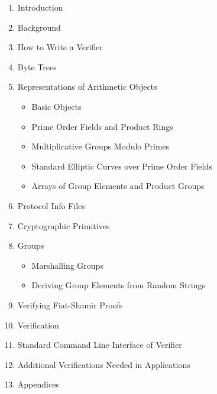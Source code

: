 \begin{enumerate}
\item Introduction
\item Background
\item How to Write a Verifier
\item Byte Trees
\item Representations of Arithmetic Objects

\begin{itemize}
\item Basic Objects
\item Prime Order Fields and Product Rings
\item Multiplicative Groups Modulo Primes
\item Standard Elliptic Curves over Prime Order Fields
\item Arrays of Group Elements and Product Groups
\end{itemize}

\item Protocol Info Files
\item Cryptographic Primitives
\item Groups

\begin{itemize}
\item Marshalling Groups
\item Deriving Group Elements from Random Strings
\end{itemize}

\item Verifying Fiat-Shamir Proofs
\item Verification
\item Standard Command Line Interface of Verifier
\item Additional Verifications Needed in Applications
\item Appendices

\end{enumerate}
